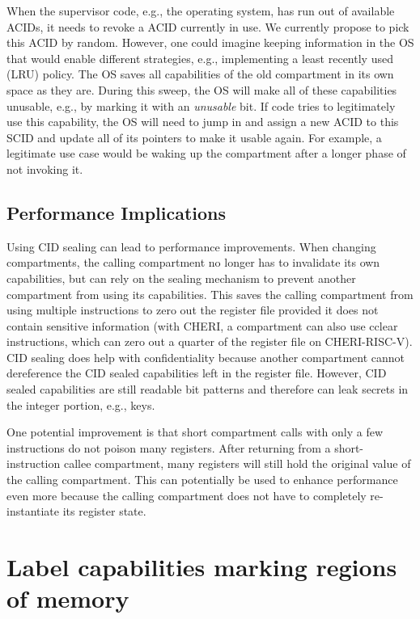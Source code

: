When the supervisor code, e.g., the operating system, has run out of available ACIDs, it needs to revoke a ACID currently in use.
We currently propose to pick this ACID by random.
However, one could imagine keeping information in the OS that would enable different strategies, e.g., implementing a least recently used (LRU) policy.
The OS saves all capabilities of the old compartment in its own space as they are.
During this sweep, the OS will make all of these capabilities unusable, e.g., by marking it with an \textit{unusable} bit.
If code tries to legitimately use this capability, the OS will need to jump in and assign a new ACID to this SCID and update all of its pointers to make it usable again.
For example, a legitimate use case would be waking up the compartment after a longer phase of not invoking it.

\subsection{Performance Implications}

Using CID sealing can lead to performance improvements.
When changing compartments, the calling compartment no longer has to invalidate its own capabilities, but can rely on the sealing mechanism to prevent another compartment from using its capabilities.
This saves the calling compartment from using multiple instructions to zero out the register file provided it does not contain sensitive information (with CHERI, a compartment can also use cclear instructions, which can zero out a quarter of the register file on CHERI-RISC-V).
CID sealing does help with confidentiality because another compartment cannot dereference the CID sealed capabilities left in the register file.
However, CID sealed capabilities are still readable bit patterns and therefore can leak secrets in the integer portion, e.g., keys.

One potential improvement is that short compartment calls with only a few instructions do not poison many registers.
After returning from a short-instruction callee compartment, many registers will still hold the original value of the calling compartment.
This can potentially be used to enhance performance even more because the calling compartment does not have to completely re-instantiate its register state.


\section{Label capabilities marking regions of memory}


